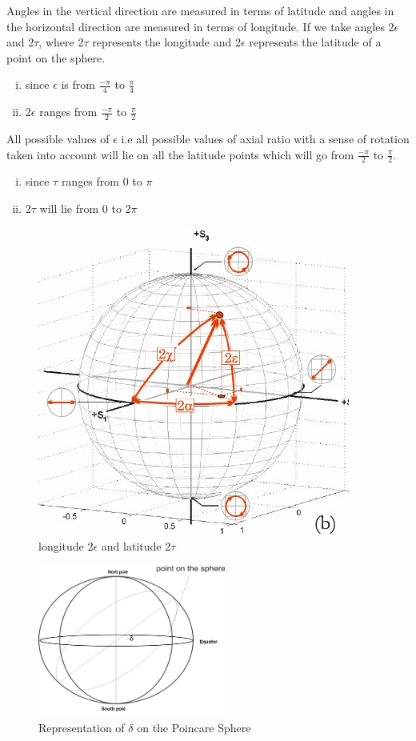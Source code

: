 Angles in the vertical direction are measured in terms of latitude and angles in the horizontal direction are measured in terms of longitude. If we take angles 2$\epsilon$ and 2$\tau$, where 2$\tau$ represents the longitude and 2$\epsilon$ represents the latitude of a point on the sphere.
\begin{enumerate}[(i)]
\item	since $\epsilon$ is from $\frac{-\pi}{4}$ to $\frac{\pi}{4}$
\item 	2$\epsilon$ ranges from $\frac{-\pi}{2}$ to $\frac{\pi}{2}$
\end{enumerate}
All possible values of $\epsilon$ i.e all possible values of axial ratio with a sense of rotation taken into account will lie on all the latitude points which will go from $\frac{-\pi}{2}$ to $\frac{\pi}{2}$. 
\begin{enumerate}[(i)]
\item 	since $\tau$ ranges from 0 to $\pi$
\item 	2$\tau$ will lie from 0 to 2$\pi$
\end{enumerate}
\begin{figure}[h]
\centering
\includegraphics[width=0.7\linewidth]{./graphics/sphere}
\caption{longitude 2$\epsilon$ and latitude 2$\tau$}
\end{figure}
\begin{figure}[h]
\centering
\includegraphics[height=5cm]{./graphics/SPHERE001}
\caption{Representation of $\delta$ on the Poincare Sphere}
\label{fig:sphere001}
\end{figure}

